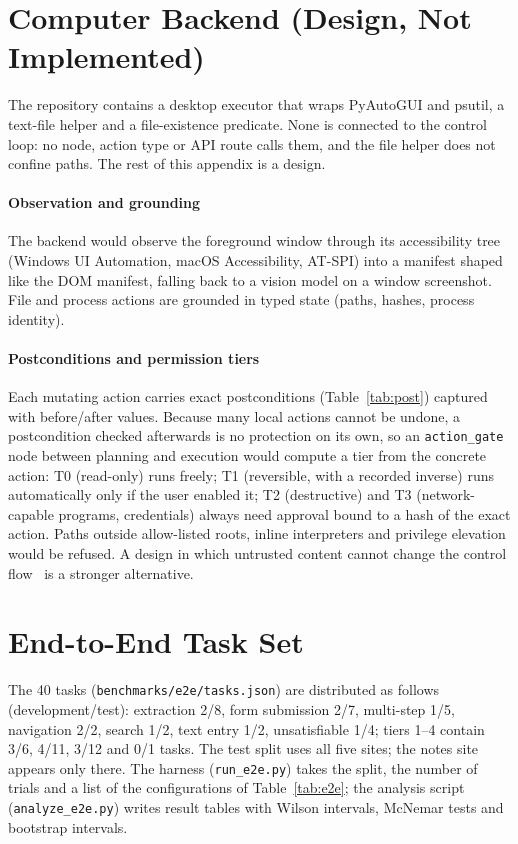 \appendices

\section{Computer Backend (Design, Not Implemented)}
\label{app:computer}

The repository contains a desktop executor that wraps PyAutoGUI and psutil, a text-file helper and a file-existence predicate. None is connected to the control loop: no node, action type or API route calls them, and the file helper does not confine paths. The rest of this appendix is a design.

\paragraph{Observation and grounding} The backend would observe the foreground window through its accessibility tree (Windows UI Automation, macOS Accessibility, AT-SPI) into a manifest shaped like the DOM manifest, falling back to a vision model on a window screenshot. File and process actions are grounded in typed state (paths, hashes, process identity).

\paragraph{Postconditions and permission tiers} Each mutating action carries exact postconditions (Table~\ref{tab:post}) captured with before/after values. Because many local actions cannot be undone, a postcondition checked afterwards is no protection on its own, so an \texttt{action\_gate} node between planning and execution would compute a tier from the concrete action: T0 (read-only) runs freely; T1 (reversible, with a recorded inverse) runs automatically only if the user enabled it; T2 (destructive) and T3 (network-capable programs, credentials) always need approval bound to a hash of the exact action. Paths outside allow-listed roots, inline interpreters and privilege elevation would be refused. A design in which untrusted content cannot change the control flow~\cite{debenedetti2025camel} is a stronger alternative.



\section{End-to-End Task Set}
\label{app:tasks}

The 40 tasks (\texttt{benchmarks/e2e/tasks.json}) are distributed as follows (development/test): extraction 2/8, form submission 2/7, multi-step 1/5, navigation 2/2, search 1/2, text entry 1/2, unsatisfiable 1/4; tiers 1--4 contain 3/6, 4/11, 3/12 and 0/1 tasks. The test split uses all five sites; the notes site appears only there. The harness (\texttt{run\_e2e.py}) takes the split, the number of trials and a list of the configurations of Table~\ref{tab:e2e}; the analysis script (\texttt{analyze\_e2e.py}) writes result tables with Wilson intervals, McNemar tests and bootstrap intervals.


